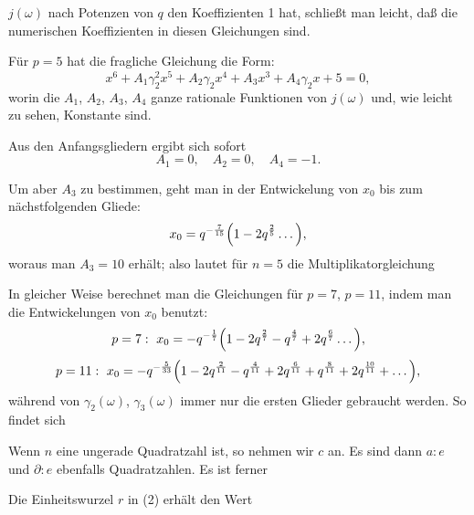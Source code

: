 $j(\omega)$ nach Potenzen von $q$ den Koeffizienten 1 hat, schließt man
leicht, daß die numerischen Koeffizienten in diesen Gleichungen
 sind.

Für $p=5$ hat die fragliche Gleichung die Form:
\[
x^6 + A_1\gamma_2^2x^5 + A_2\gamma_2x^4 + A_3x^3 + A_4\gamma_2x + 5 = 0,
\]
worin die $A_1$, $A_2$, $A_3$, $A_4$ ganze rationale Funktionen von
$j(\omega)$ und, wie leicht zu sehen, Konstante sind.

Aus den Anfangsgliedern ergibt sich sofort
\[
A_1 = 0, \quad A_2 = 0, \quad A_4 = -1.
\]

Um aber $A_3$ zu bestimmen, geht man in der Entwickelung von $x_0$ bis
zum nächstfolgenden Gliede:
\[
x_0 = q^{-\frac{7}{15}}\Bigl(1 - 2q^{\frac{2}{5}}\dots\Bigr),
\]
woraus man $A_3 = 10$ erhält; also lautet für $n=5$ die
Multiplikatorgleichung

In gleicher Weise berechnet man die Gleichungen für $p=7$, $p=11$,
indem man die Entwickelungen von $x_0$ benutzt:
\[
p=7:\ x_0 = -q^{-\frac{1}{7}}\Bigl(1 - 2q^{\frac{2}{7}} - q^{\frac{4}{7}} + 2q^{\frac{6}{7}}\dots\Bigr),
\]
\[
p=11:\ x_0 = -q^{-\frac{5}{33}}\Bigl(1 - 2q^{\frac{2}{11}} - q^{\frac{4}{11}} + 2q^{\frac{6}{11}} + q^{\frac{8}{11}} + 2q^{\frac{10}{11}} + \dots\Bigr),
\]
während von $\gamma_2(\omega)$, $\gamma_3(\omega)$ immer nur die ersten
Glieder gebraucht werden. So findet sich

Wenn $n$ eine ungerade Quadratzahl ist, so nehmen wir $c$  an. Es sind dann $a:e$ und $\partial:e$ ebenfalls
Quadratzahlen. Es ist ferner

Die Einheitswurzel $r$ in (2) erhält den Wert
